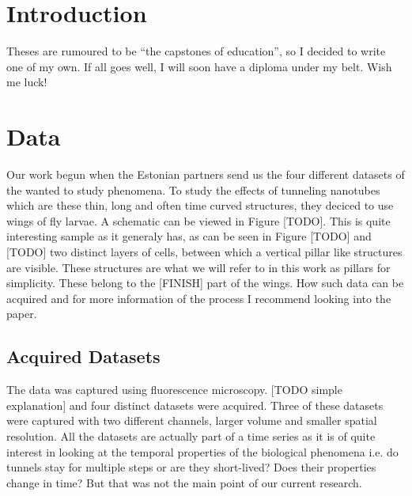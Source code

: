 \documentclass[
  digital,     %
  oneside,     %
  nosansbold,  %
  nocolorbold, %
  lof,         %
  lot,         %
]{fithesis4}
\begin{document}
\chapter*{Introduction}

Theses are rumoured to be \enquote{the capstones of education}, so
I decided to write one of my own. If all goes well, I will soon
have a diploma under my belt. Wish me luck!

\chapter{Data}

    Our work begun when the Estonian partners send us the four different datasets of
the wanted to study phenomena. To study the effects of tunneling nanotubes which
are these thin, long and often time curved structures, they deciced to use wings
of fly larvae. A schematic can be viewed in Figure [TODO]. This is quite
interesting sample as it generaly has, as can be seen in Figure [TODO] and
[TODO] two distinct layers of cells, between which a vertical pillar like
structures are visible. These structures are what we will refer to in this work
as pillars for simplicity. These belong to the [FINISH] part of the wings. How
such data can be acquired and for more information of the process I recommend
looking into the \parencite{Tran2024Programmed} paper.

\section{Acquired Datasets}

The data was captured using fluorescence microscopy. [TODO simple explanation]
and four distinct datasets were acquired. Three of these datasets were captured
with two different channels, larger volume and smaller spatial resolution. All
the datasets are actually part of a time series as it is of quite interest in
looking at the temporal properties of the biological phenomena i.e. do tunnels
stay for multiple steps or are they short-lived? Does their properties change in
time? But that was not the main point of our current research.
\end{document}
